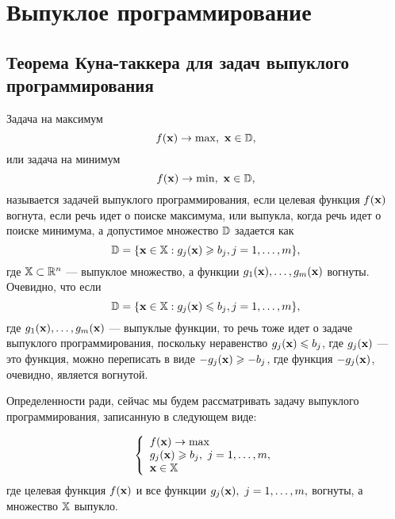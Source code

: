 \section{Выпуклое программирование}



\subsection{Теорема Куна-таккера для задач выпуклого программирования}

    Задача на максимум
\begin{equation*}
    f(\vc{x})\rightarrow\max, \ \vc{x}\in\st{D},
\end{equation*}
    или задача на минимум
\begin{equation*}
    f(\vc{x})\rightarrow\min, \ \vc{x}\in\st{D},
\end{equation*}
    называется задачей выпуклого программирования, если целевая функция
    $f(\mathbf{x})$ вогнута, если речь идет о поиске максимума, или
    выпукла, когда речь идет о поиске минимума, а допустимое
    множество $\mathbb{D}$ задается как
\[
    \mathbb{D}=\{\mathbf{x} \in \mathbb{X}:  g_j (\mathbf{x}) \geqslant b_j,  j=1,\ldots,m\},
\]
    где $\mathbb{X}\subset\mathbb{R}^{n}$ --- выпуклое множество, а
    функции $g_1(\mathbf{x}), \ldots, g_m(\mathbf{x})$
    вогнуты. Очевидно, что если
\[
    \mathbb{D}=\{\mathbf{x} \in \mathbb{X}:  g_j (\mathbf{x}) \leqslant b_j, j=1,\ldots,m\},
\]
    где $g_1(\mathbf{x}), \ldots, g_m(\mathbf{x})$ --- выпуклые функции, то речь
    тоже идет о задаче выпуклого программирования, поскольку
    неравенство $g_j (\mathbf{x}) \leqslant b_j$, где $g_j (\mathbf{x})$ ---
    это функция, можно переписать в виде $-g_j (\mathbf{x}) \geqslant -b_j$,
    где функция $-g_j (\mathbf{x})$, очевидно, является вогнутой.


    Определенности ради, сейчас мы будем рассматривать задачу
    выпуклого программирования, записанную в следующем виде:

\begin{equation}\label{problem:ZVPgeq}
    \left\{ \begin{array}{l}
         f(\mathbf{x}) \to \max  \\
        g_j (\mathbf{x}) \geqslant b_j, \ j = 1,\ldots,m,\\
        \mathbf{x} \in \mathbb{X} \\
  \end{array} \right.
\end{equation}
    где целевая функция $f(\mathbf{x})$ и все функции $g_j (\mathbf{x}), \ j =
    1,\ldots,m,$ вогнуты, а множество $\mathbb{X}$ выпукло.

